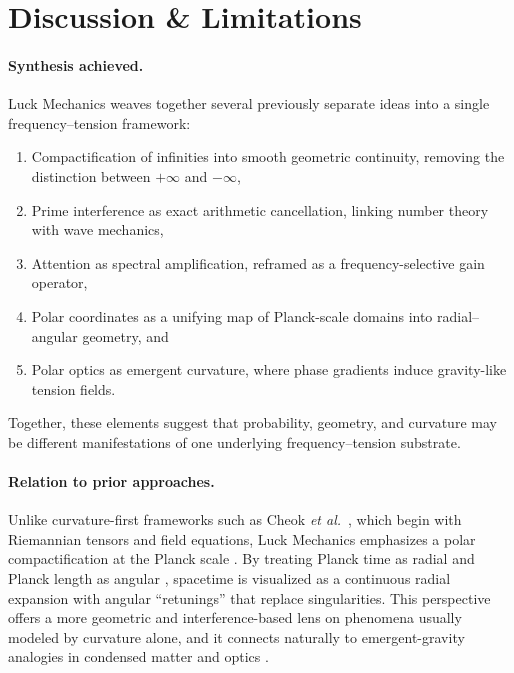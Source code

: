 \documentclass[12pt]{article}
\theoremstyle{plain}
\theoremstyle{definition}
\begin{document}
\section{Discussion \& Limitations}

\paragraph{Synthesis achieved.}  
Luck Mechanics weaves together several previously separate ideas into a single 
frequency–tension framework:
\begin{enumerate}[leftmargin=1.1em]
  \item Compactification of infinities into smooth geometric continuity, removing 
  the distinction between $+\infty$ and $-\infty$,
  \item Prime interference as exact arithmetic cancellation, linking number theory 
  with wave mechanics,
  \item Attention as spectral amplification, reframed as a frequency-selective gain 
  operator,
  \item Polar coordinates as a unifying map of Planck-scale domains into radial–angular 
  geometry, and
  \item Polar optics as emergent curvature, where phase gradients induce 
  gravity-like tension fields.
\end{enumerate}
Together, these elements suggest that probability, geometry, and curvature may be 
different manifestations of one underlying frequency–tension substrate.

\paragraph{Relation to prior approaches.}  
Unlike curvature-first frameworks such as Cheok \emph{et al.}~\citep{Cheok2025}, 
which begin with Riemannian tensors and field equations, Luck Mechanics emphasizes 
a polar compactification at the Planck scale \citep{PlanckUnits}. By treating 
Planck time as radial and Planck length as angular \citep{PolarCoords}, spacetime 
is visualized as a continuous radial expansion with angular ``retunings'' that 
replace singularities. This perspective offers a more geometric and interference-based 
lens on phenomena usually modeled by curvature alone, and it connects naturally to 
emergent-gravity analogies in condensed matter and optics \citep{PhysRevResearch033343}.
\end{document}
